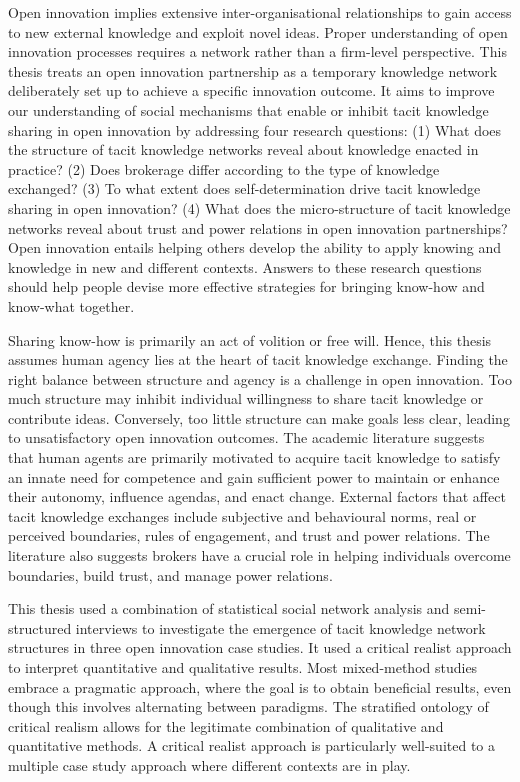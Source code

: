 \documentclass[12pt,table]{book}
\begin{document}
Open innovation implies extensive inter-organisational relationships to gain access to new external knowledge and exploit novel ideas. Proper understanding of open innovation processes requires a network rather than a firm-level perspective. This thesis treats an open innovation partnership as a temporary knowledge network deliberately set up to achieve a specific innovation outcome. It aims to improve our understanding of social mechanisms that enable or inhibit tacit knowledge sharing in open innovation by addressing four research questions: (1) What does the structure of tacit knowledge networks reveal about knowledge enacted in practice? (2) Does brokerage differ according to the type of knowledge exchanged? (3) To what extent does self-determination drive tacit knowledge sharing in open innovation? (4) What does the micro-structure of tacit knowledge networks reveal about trust and power relations in open innovation partnerships? Open innovation entails helping others develop the ability to apply knowing and knowledge in new and different contexts. Answers to these research questions should help people devise more effective strategies for bringing know-how and know-what together. \medskip

Sharing know-how is primarily an act of volition or free will. Hence, this thesis assumes human agency lies at the heart of tacit knowledge exchange. Finding the right balance between structure and agency is a challenge in open innovation. Too much structure may inhibit individual willingness to share tacit knowledge or contribute ideas. Conversely, too little structure can make goals less clear, leading to unsatisfactory open innovation outcomes. The academic literature suggests that human agents are primarily motivated to acquire tacit knowledge to satisfy an innate need for competence and gain sufficient power to maintain or enhance their autonomy, influence agendas, and enact change. External factors that affect tacit knowledge exchanges include subjective and behavioural norms, real or perceived boundaries, rules of engagement, and trust and power relations. The literature also suggests brokers have a crucial role in helping individuals overcome boundaries, build trust, and manage power relations. \medskip

This thesis used a combination of statistical social network analysis and semi-structured interviews to investigate the emergence of tacit knowledge network structures in three open innovation case studies. It used a critical realist approach to interpret quantitative and qualitative results. Most mixed-method studies embrace a pragmatic approach, where the goal is to obtain beneficial results, even though this involves alternating between paradigms. The stratified ontology of critical realism allows for the legitimate combination of qualitative and quantitative methods. A critical realist approach is particularly well-suited to a multiple case study approach where different contexts are in play. \medskip
\end{document}
